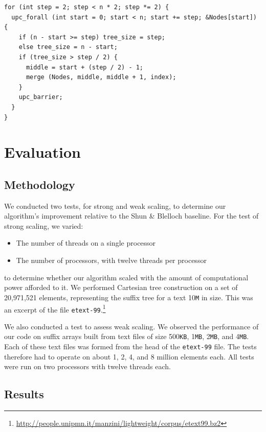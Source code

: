 \documentclass[10pt]{article}
\begin{document}
\lstset{language=C}
\begin{minipage}{\linewidth}
\begin{lstlisting}
for (int step = 2; step < n * 2; step *= 2) {
  upc_forall (int start = 0; start < n; start += step; &Nodes[start]) {
    if (n - start >= step) tree_size = step;
    else tree_size = n - start;
    if (tree_size > step / 2) {
      middle = start + (step / 2) - 1;
      merge (Nodes, middle, middle + 1, index);
    }
    upc_barrier;
  }
}
\end{lstlisting}
\end{minipage}

\section{Evaluation}

\subsection{Methodology}

We conducted two tests, for strong and weak scaling, to determine our algorithm's improvement
relative to the Shun \& Blelloch baseline.
For the test of strong scaling, we varied:
\begin{itemize}[noitemsep]
  \item The number of threads on a single processor
  \item The number of processors, with twelve threads per processor
\end{itemize}
to determine whether our algorithm scaled with the amount of computational power afforded to it.
We performed Cartesian tree construction on a set of 20,971,521 elements, representing the suffix
tree for a text 10\texttt{M} in size.
This was an excerpt of the file
\texttt{etext-99}.\footnote{\url{http://people.unipmn.it/manzini/lightweight/corpus/etext99.bz2}}

We also conducted a test to assess weak scaling.
We observed the performance of our code on suffix arrays built from text files of size 
500\texttt{KB}, 1\texttt{MB}, 2\texttt{MB}, and 4\texttt{MB}.
Each of these text files was formed from the head of the \texttt{etext-99} file.
The tests therefore had to operate on about 1, 2, 4, and 8 million elements each.
All tests were run on two processors with twelve threads each.

\subsection{Results}
\end{document}
